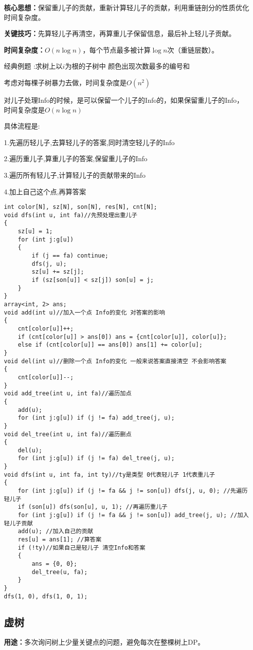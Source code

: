 \documentclass[a4paper, fontset=none]{ctexart}
\begin{document}
\textbf{核心思想：}保留重儿子的贡献，重新计算轻儿子的贡献，利用重链剖分的性质优化时间复杂度。

\textbf{关键技巧：}先算轻儿子再清空，再算重儿子保留信息，最后补上轻儿子贡献。

\textbf{时间复杂度：}$O(n\log n)$，每个节点最多被计算$\log n$次（重链层数）。

经典例题 :求树上以$i$为根的子树中 颜色出现次数最多的编号和

考虑对每棵子树暴力去做，时间复杂度是$O(n ^ 2)$

对儿子处理Info的时候，是可以保留一个儿子的Info的，如果保留重儿子的Info，时间复杂度是$O(n\log n)$

具体流程是:

1.先遍历轻儿子,去算轻儿子的答案,同时清空轻儿子的Info

2.遍历重儿子,算重儿子的答案,保留重儿子的Info

3.遍历所有轻儿子,计算轻儿子的贡献带来的Info

4.加上自己这个点,再算答案

\begin{verbatim}
int color[N], sz[N], son[N], res[N], cnt[N];
void dfs(int u, int fa)//先预处理出重儿子
{
    sz[u] = 1;
    for (int j:g[u])
    {
        if (j == fa) continue;
        dfs(j, u);
        sz[u] += sz[j];
        if (sz[son[u]] < sz[j]) son[u] = j;
    }
}
array<int, 2> ans;
void add(int u)//加入一个点 Info的变化 对答案的影响
{
    cnt[color[u]]++;
    if (cnt[color[u]] > ans[0]) ans = {cnt[color[u]], color[u]};
    else if (cnt[color[u]] == ans[0]) ans[1] += color[u];
}
void del(int u)//删除一个点 Info的变化 一般来说答案直接清空 不会影响答案
{
    cnt[color[u]]--;
}
void add_tree(int u, int fa)//遍历加点
{
    add(u);
    for (int j:g[u]) if (j != fa) add_tree(j, u);
}
void del_tree(int u, int fa)//遍历删点
{
    del(u);
    for (int j:g[u]) if (j != fa) del_tree(j, u);
}
void dfs(int u, int fa, int ty)//ty是类型 0代表轻儿子 1代表重儿子
{
    for (int j:g[u]) if (j != fa && j != son[u]) dfs(j, u, 0); //先遍历轻儿子
    if (son[u]) dfs(son[u], u, 1); //再遍历重儿子
    for (int j:g[u]) if (j != fa && j != son[u]) add_tree(j, u); //加入轻儿子贡献
    add(u); //加入自己的贡献
    res[u] = ans[1]; //算答案
    if (!ty)//如果自己是轻儿子 清空Info和答案
    {
        ans = {0, 0};
        del_tree(u, fa);
    }
}
dfs(1, 0), dfs(1, 0, 1);
\end{verbatim}
\subsection{虚树}
\textbf{用途：}多次询问树上少量关键点的问题，避免每次在整棵树上DP。
\end{document}
